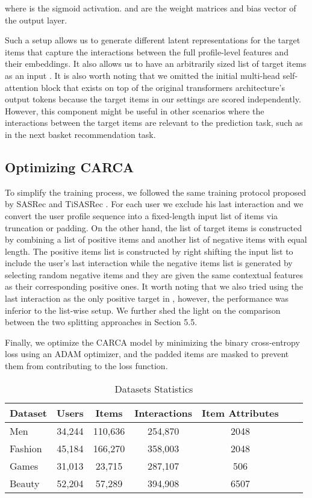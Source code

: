 \documentclass[sigconf,natbib=true]{acmart}
\begin{document}
\noindent where  is the sigmoid activation.  and  are the weight matrices and bias vector of the output layer. 

Such a setup allows us to generate different latent representations for the target items that capture the interactions between the full profile-level features and their embeddings. It also allows us to have an arbitrarily sized list of target items as an input . It is also worth noting that we omitted the initial multi-head self-attention block that exists on top of the original transformers architecture's output tokens because the target items in our settings are scored independently. However, this component might be useful in other scenarios where the interactions between the target items are relevant to the prediction task, such as in the next basket recommendation task.

\subsection{Optimizing CARCA}
To simplify the training process, we followed the same training protocol proposed by SASRec and TiSASRec \cite{kang2018self, li2020time}. For each user we exclude his last interaction and we convert the user profile sequence into a fixed-length input list of items  via truncation or padding. On the other hand, the list of target items is constructed by combining a list of positive items  and another list of negative items  with equal length. The positive items list is constructed by right shifting the input list  to include the user's last interaction  while the negative items list is generated by selecting random negative items  and they are given the same contextual features as their corresponding positive ones. It worth noting that we also tried using the last interaction as the only positive target in , however, the performance was inferior to the list-wise setup. We further shed the light on the comparison between the two splitting approaches in Section 5.5.

Finally, we optimize the CARCA model by minimizing the binary cross-entropy loss using an ADAM optimizer, and the padded items are masked to prevent them from contributing to the loss function.










\begin{table}[!ht]
\caption{Datasets Statistics}
\label{datasets}
\small
\begin{center}
  \begin{tabular}{lcccccc}
    \toprule
    Dataset&Users&Items&Interactions&Item Attributes\\
    \midrule
Men & 34,244 & 110,636 & 254,870 & 2048 \\
Fashion & 45,184 & 166,270 & 358,003 & 2048  \\
Games & 31,013 & 23,715 & 287,107 & 506   \\
Beauty & 52,204 & 57,289 & 394,908 & 6507  \\
   \bottomrule
  \end{tabular}
  \end{center}
\end{table}
\end{document}
